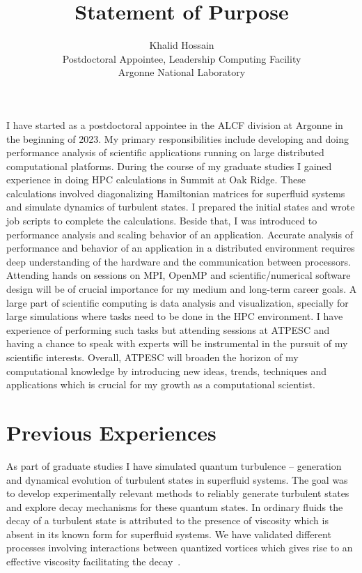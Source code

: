 \documentclass{article}
\title{Statement of Purpose}
\author{Khalid Hossain \\
        Postdoctoral Appointee, Leadership Computing Facility \\
        Argonne National Laboratory}
\date{}
\begin{document}
\maketitle

I have started as a postdoctoral appointee in the ALCF division at Argonne in 
the beginning of 2023. My primary responsibilities include developing and 
doing performance 
analysis of scientific applications running on large distributed computational
platforms. During the course of my graduate studies I gained experience in 
doing HPC calculations in Summit at Oak Ridge. These calculations involved
diagonalizing Hamiltonian matrices for superfluid systems and simulate dynamics
of turbulent states. I prepared the initial states and wrote job scripts to
complete the calculations. Beside that, I was introduced to performance analysis
and scaling behavior of an application. Accurate analysis of performance and
behavior of an application in a distributed environment requires deep 
understanding of the hardware and the communication between processors. 
Attending hands 
on sessions on MPI, OpenMP and scientific/numerical software design  will be of 
crucial importance for my medium and 
long-term career goals. A large part of scientific computing is data analysis
and visualization, specially for large simulations where tasks need to be done 
in the HPC environment. I have experience of performing such tasks but 
attending sessions at ATPESC and having a chance to speak with experts will be
instrumental in the pursuit of my scientific interests. Overall, ATPESC will 
broaden the horizon of my computational 
knowledge by introducing new ideas, trends, techniques and applications which 
is crucial for my growth as a computational scientist. 

\section*{Previous Experiences}

As part of graduate studies I have simulated quantum turbulence -- generation 
and dynamical evolution of turbulent states in superfluid systems. The goal was 
to
develop experimentally relevant methods to reliably generate turbulent states
and explore decay mechanisms for these quantum states. In ordinary fluids the
decay of a turbulent state is attributed to the presence of viscosity which is
absent in its known form for superfluid systems. We have validated different 
processes involving interactions between quantized vortices which gives rise to 
an effective viscosity facilitating the decay~\cite{Hossain:2022}.
\end{document}
